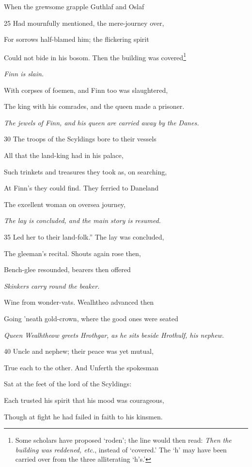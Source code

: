 When the grewsome grapple Guthlaf and Oslaf

25
Had mournfully mentioned, the mere-journey over,

For sorrows half-blamed him; the flickering spirit

Could not bide in his bosom. Then the building was covered\footnote{Some scholars have proposed ‘roden’; the line would then read: \emph{Then
the building was reddened, etc.}, instead of ‘covered.’ The ‘h’ may have been
carried over from the three alliterating ‘h’s.’}

\emph{Finn is slain.}

With corpses of foemen, and Finn too was slaughtered,

The king with his comrades, and the queen made a prisoner.

\emph{The jewels of Finn,
and his queen are
carried away by
the Danes.}

30
The troops of the Scyldings bore to their vessels

All that the land-king had in his palace,

Such trinkets and treasures they took as, on searching,

At Finn’s they could find. They ferried to Daneland

The excellent woman on oversea journey,

\emph{The lay is concluded,
and the
main story is resumed.}

35
Led her to their land-folk.” The lay was concluded,

The gleeman’s recital. Shouts again rose then,

Bench-glee resounded, bearers then offered

\emph{Skinkers carry
round the beaker.}

Wine from wonder-vats. Wealhtheo advanced then

Going ’neath gold-crown, where the good ones were seated

\emph{Queen Wealhtheow
greets
Hrothgar, as he
sits beside Hrothulf,
his nephew.}

40
Uncle and nephew; their peace was yet mutual,

True each to the other. And Unferth the spokesman

Sat at the feet of the lord of the Scyldings:

Each trusted his spirit that his mood was courageous,

Though at fight he had failed in faith to his kinsmen.

